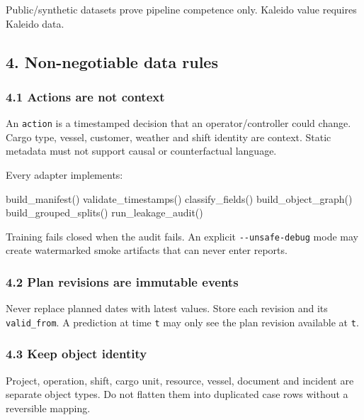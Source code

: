 \documentclass[
  spanish,
  10pt,
  a4paper,
]{article}
\newenvironment{Shaded}{}{}
\newcommand{\NormalTok}[1]{#1}
\begin{document}
Public/synthetic datasets prove pipeline competence only. Kaleido value
requires Kaleido data.

\subsection{4. Non-negotiable data
rules}\label{4-non-negotiable-data-rules}

\subsubsection{4.1 Actions are not
context}\label{41-actions-are-not-context}

An \texttt{action} is a timestamped decision that an operator/controller
could change. Cargo type, vessel, customer, weather and shift identity
are context. Static metadata must not support causal or counterfactual
language.

Every adapter implements:

\begin{Shaded}
\begin{Highlighting}[]
\NormalTok{build\_manifest()}
\NormalTok{validate\_timestamps()}
\NormalTok{classify\_fields()}
\NormalTok{build\_object\_graph()}
\NormalTok{build\_grouped\_splits()}
\NormalTok{run\_leakage\_audit()}
\end{Highlighting}
\end{Shaded}

Training fails closed when the audit fails. An explicit
\texttt{-\/-unsafe-debug} mode may create watermarked smoke artifacts
that can never enter reports.

\subsubsection{4.2 Plan revisions are immutable
events}\label{42-plan-revisions-are-immutable-events}

Never replace planned dates with latest values. Store each revision and
its \texttt{valid\_from}. A prediction at time \texttt{t} may only see
the plan revision available at \texttt{t}.

\subsubsection{4.3 Keep object identity}\label{43-keep-object-identity}

Project, operation, shift, cargo unit, resource, vessel, document and
incident are separate object types. Do not flatten them into duplicated
case rows without a reversible mapping.
\end{document}
